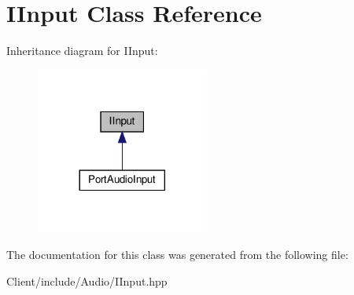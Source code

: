 \hypertarget{class_i_input}{}\section{I\+Input Class Reference}
\label{class_i_input}


Inheritance diagram for I\+Input\+:
\nopagebreak
\begin{figure}[H]
\begin{center}
\leavevmode
\includegraphics[width=161pt]{class_i_input__inherit__graph}
\end{center}
\end{figure}


The documentation for this class was generated from the following file\+:\begin{DoxyCompactItemize}
\item 
Client/include/\+Audio/I\+Input.\+hpp\end{DoxyCompactItemize}
